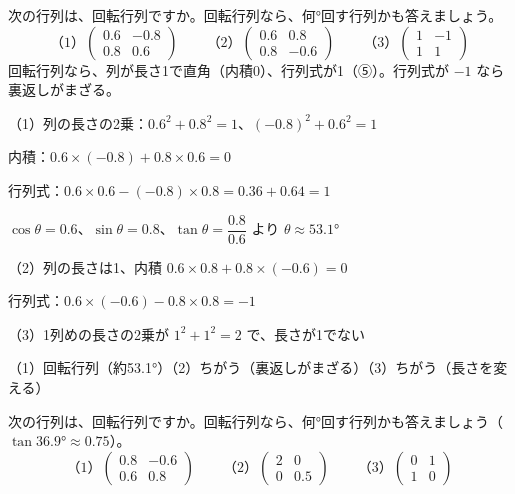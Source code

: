 \begin{reidai}[回転行列かどうかを見分ける]
次の行列は、回転行列ですか。回転行列なら、何°回す行列かも答えましょう。
\[\text{（1）}\begin{pmatrix}0.6&-0.8\\0.8&0.6\end{pmatrix}\qquad\text{（2）}\begin{pmatrix}0.6&0.8\\0.8&-0.6\end{pmatrix}\qquad\text{（3）}\begin{pmatrix}1&-1\\1&1\end{pmatrix}\]
\kangaekata 回転行列なら、列が長さ1で直角（内積0）、行列式が1（⑤）。行列式が $-1$ なら裏返しがまざる。\par
\shiki （1）\nobreak 列の長さの2乗：$0.6^2+0.8^2=1$、$(-0.8)^2+0.6^2=1$\par
\kviigq \phantom{（1）}内積：$0.6\times(-0.8)+0.8\times0.6=0$\par
\kviigq \phantom{（1）}行列式：$0.6\times0.6-(-0.8)\times0.8=0.36+0.64=1$\par
\kviigq \phantom{（1）}$\cos\theta=0.6$、$\sin\theta=0.8$、$\tan\theta=\dfrac{0.8}{0.6}$ より $\theta\approx53.1°$\par
\kviigq （2）\nobreak 列の長さは1、内積 $0.6\times0.8+0.8\times(-0.6)=0$\par
\kviigq \phantom{（2）}行列式：$0.6\times(-0.6)-0.8\times0.8=-1$\par
\kviigq （3）\nobreak 1列めの長さの2乗が $1^2+1^2=2$ で、長さが1でない\par
\kotae （1）\nobreak 回転行列（約53.1°）\quad（2）\nobreak ちがう（裏返しがまざる）\quad（3）\nobreak ちがう（長さを変える）\par
\vspace{2pt}
\end{reidai}

\begin{jibun}
次の行列は、回転行列ですか。回転行列なら、何°回す行列かも答えましょう（$\tan36.9°\approx0.75$）。
\[\text{（1）}\begin{pmatrix}0.8&-0.6\\0.6&0.8\end{pmatrix}\qquad\text{（2）}\begin{pmatrix}2&0\\0&0.5\end{pmatrix}\qquad\text{（3）}\begin{pmatrix}0&1\\1&0\end{pmatrix}\]
\end{jibun}

